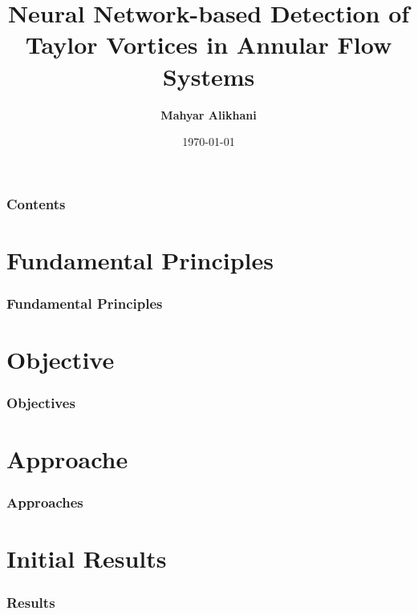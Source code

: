 \documentclass[aspectratio=169]{beamer}
\title{Neural Network-based Detection of Taylor Vortices in Annular Flow Systems}
\subtitle{}
\author{\textbf{Mahyar Alikhani}}
\institute{Institute of Applied Mechanics}
\date{\today}
\begin{document}
\begin{frame}
\titlepage
\end{frame}

\begin{frame}
\frametitle{Contents}
\tableofcontents
\end{frame}

\section{Fundamental Principles}
\begin{frame}
  \frametitle{Fundamental Principles}
\end{frame}

\section{Objective}
\begin{frame}
  \frametitle{Objectives}
\end{frame}


\section{Approache}
\begin{frame}
  \frametitle{Approaches}
\end{frame}
\section{Initial Results}
\begin{frame}
  \frametitle{Results}
\end{frame}

\begin{frame}
\frametitle{}\
  \begin{minipage}{0.45\textwidth}
    \centering
    \vfill
  \end{minipage}
  \begin{minipage}{0.45\textwidth}
    \centering
    \vfill
  \end{minipage}
\end{frame}
\end{document}
